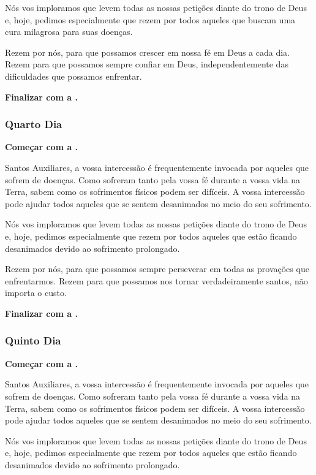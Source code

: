 \documentclass[a4paper,12pt]{extarticle} \usepackage[utf8]{inputenc}
\begin{document}
Nós vos imploramos que levem todas as nossas petições diante do trono de Deus e, hoje, pedimos especialmente que rezem por todos aqueles que buscam uma cura milagrosa para suas doenças.

Rezem por nós, para que possamos crescer em nossa fé em Deus a cada dia. Rezem para que possamos sempre confiar em Deus, independentemente das dificuldades que possamos enfrentar.


\textbf{Finalizar com a .}


\subsubsection{Quarto Dia}

\textbf{Começar com a .}

Santos Auxiliares, a vossa intercessão é frequentemente invocada por aqueles que sofrem de doenças. Como sofreram tanto pela vossa fé durante a vossa vida na Terra, sabem como os sofrimentos físicos podem ser difíceis. A vossa intercessão pode ajudar todos aqueles que se sentem desanimados no meio do seu sofrimento.

Nós vos imploramos que levem todas as nossas petições diante do trono de Deus e, hoje, pedimos especialmente que rezem por todos aqueles que estão ficando desanimados devido ao sofrimento prolongado.

Rezem por nós, para que possamos sempre perseverar em todas as provações que enfrentarmos. Rezem para que possamos nos tornar verdadeiramente santos, não importa o custo.

\textbf{Finalizar com a .}


\subsubsection{Quinto Dia}

\textbf{Começar com a .}

Santos Auxiliares, a vossa intercessão é frequentemente invocada por aqueles que sofrem de doenças. Como sofreram tanto pela vossa fé durante a vossa vida na Terra, sabem como os sofrimentos físicos podem ser difíceis. A vossa intercessão pode ajudar todos aqueles que se sentem desanimados no meio do seu sofrimento.

Nós vos imploramos que levem todas as nossas petições diante do trono de Deus e, hoje, pedimos especialmente que rezem por todos aqueles que estão ficando desanimados devido ao sofrimento prolongado.
\end{document}
